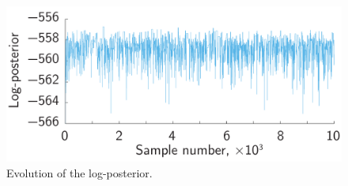\begin{figure}
  \centering
  \includegraphics[width=0.7\linewidth]{include/figures/log-posterior.pdf}
  \caption{Evolution of the log-posterior.}
  \vspace{-1.5em}
\end{figure}
